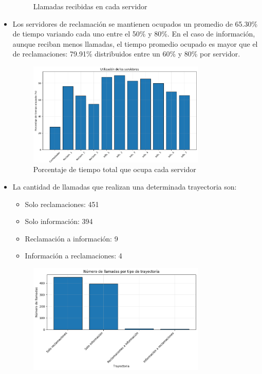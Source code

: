 \documentclass[12pt]{article}
\begin{document}
\begin{itemize}
\begin{figure}[h]
        \caption{Llamadas recibidas en cada servidor}
        \label{fig: Llamadas recibidas en cada servidor}
    \end{figure}
    \item Los servidores de reclamación se mantienen ocupados un promedio de 65.30\% de tiempo variando cada uno entre el 50\% y 80\%. En el caso de información, aunque reciban menos llamadas, el tiempo promedio ocupado es mayor que el de reclamaciones: 79.91\% distribuidos entre un 60\% y 80\% por servidor.
    \begin{figure}[h]
        \centering
        \includegraphics[width=0.8\textwidth]{server_utilization.png}
        \caption{Porcentaje de tiempo total que ocupa cada servidor}
        \label{fig: Porcentaje de tiempo total que ocupa cada servidor}
    \end{figure}
    \item La cantidad de llamadas que realizan una determinada trayectoria son:
    \begin{itemize}
        \item Solo reclamaciones: 451
        \item Solo información: 394
        \item Reclamación a información: 9
        \item Información a reclamaciones: 4
    \end{itemize}
    \begin{figure}[h]
        \centering
        \includegraphics[width=0.8\textwidth]{trajectories.png}

\end{figure}
\end{itemize}
\end{document}

